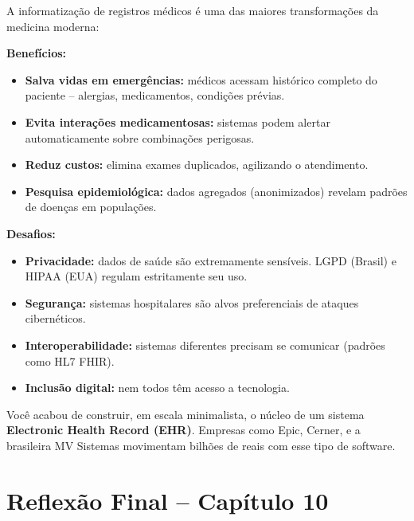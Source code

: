 \documentclass[12pt,a4paper]{article}
\begin{document}
\begin{tcolorbox}[colback=ecolightgreen,colframe=ecogreen,
  title={\bfseries Registros eletrônicos de saúde}]

A informatização de registros médicos é uma das maiores transformações da
medicina moderna:

\textbf{Benefícios:}
\begin{itemize}[noitemsep]
  \item \textbf{Salva vidas em emergências:} médicos acessam histórico completo
  do paciente -- alergias, medicamentos, condições prévias.
  \item \textbf{Evita interações medicamentosas:} sistemas podem alertar
  automaticamente sobre combinações perigosas.
  \item \textbf{Reduz custos:} elimina exames duplicados, agilizando o atendimento.
  \item \textbf{Pesquisa epidemiológica:} dados agregados (anonimizados) revelam
  padrões de doenças em populações.
\end{itemize}

\textbf{Desafios:}
\begin{itemize}[noitemsep]
  \item \textbf{Privacidade:} dados de saúde são extremamente sensíveis. LGPD
  (Brasil) e HIPAA (EUA) regulam estritamente seu uso.
  \item \textbf{Segurança:} sistemas hospitalares são alvos preferenciais de
  ataques cibernéticos.
  \item \textbf{Interoperabilidade:} sistemas diferentes precisam se comunicar
  (padrões como HL7 FHIR).
  \item \textbf{Inclusão digital:} nem todos têm acesso a tecnologia.
\end{itemize}

Você acabou de construir, em escala minimalista, o núcleo de um sistema
\textbf{Electronic Health Record (EHR)}. Empresas como Epic, Cerner, e a brasileira
MV Sistemas movimentam bilhões de reais com esse tipo de software.
\end{tcolorbox}

\bigskip

\section*{Reflexão Final -- Capítulo 10}
\end{document}
